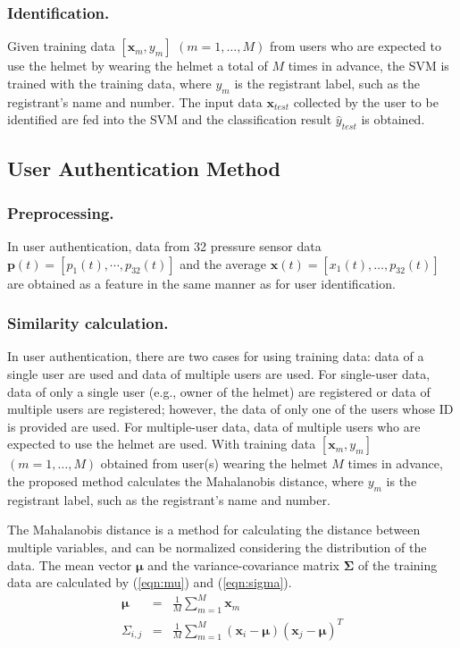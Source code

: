 \documentclass[sigconf,authordraft]{acmart}
\begin{document}
\subsubsection{Identification.}
Given training data $[\bm{x}_m,y_m]$ $(m=1,\dots, M)$ from users who are expected to use the helmet by wearing the helmet a total of $M$ times in advance, the SVM is trained with the training data, where $y_m$ is the registrant label, such as the registrant's name and number. The input data $\bm{x}_{test}$ collected by the user to be identified are fed into the SVM and the classification result $\hat{y}_{test}$ is obtained.


\subsection{User Authentication Method}
\subsubsection{Preprocessing.}
In user authentication, data from 32 pressure sensor data $\bm{p}(t)=[p_1(t),\cdots,p_{32}(t)]$ and the average $\bm{x}(t)=[x_{1}(t),\dots,p_{32}(t)]$ are obtained as a feature in the same manner as for user identification.


\subsubsection{Similarity calculation.}
In user authentication, there are two cases for using training data: data of a single user are used and data of multiple users are used. For single-user data, data of only a single user (e.g., owner of the helmet) are registered or data of multiple users are registered; however, the data of only one of the users whose ID is provided are used. For multiple-user data, data of multiple users who are expected to use the helmet are used. With training data $[\bm{x}_m,y_m]$ $(m=1,\dots, M)$ obtained from user(s) wearing the helmet $M$ times in advance, the proposed method calculates the Mahalanobis distance, where $y_m$ is the registrant label, such as the registrant's name and number.\par

The Mahalanobis distance is a method for calculating the distance between multiple variables, and can be normalized considering the distribution of the data. The mean vector $\bm{\mu}$ and the variance-covariance matrix $\bm{\Sigma}$ of the training data are calculated by (\ref{eqn:mu}) and (\ref{eqn:sigma}).
\begin{eqnarray}
\label{eqn:mu}
  \bm{\mu} &=& \frac{1}{M}\sum_{m=1}^{M}\bm{x}_m \\
\label{eqn:sigma}
  \Sigma_{i,j} &=& \frac{1}{M}\sum_{m=1}^{M}(\bm{x}_i-\bm{\mu})(\bm{x}_j-\bm{\mu})^T
\end{eqnarray}
 
\end{document}
